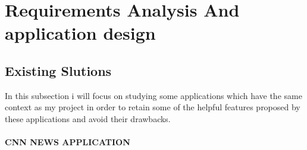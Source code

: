 \chapter{Requirements Analysis And application design}


\section{Existing Slutions}
In this subsection i will focus on studying some applications which have the same context as my project in order to retain some of  the helpful features proposed by these applications and avoid their drawbacks. 
\subsubsection{CNN NEWS APPLICATION }

